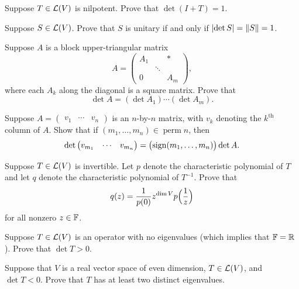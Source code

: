 \begin{exercise}
Suppose $T\in\Lin(V)$ is nilpotent. Prove that $\det(I+T)=1$.
\end{exercise}

\begin{exercise}
Suppose $S\in\Lin(V)$. Prove that $S$ is unitary if and only if
$\abs{\det S}=\norm{S}=1$.
\end{exercise}

\begin{exercise}
Suppose $A$ is a block upper-triangular matrix
\[ A = \begin{pmatrix}
       A_1 &        & *\\
           & \ddots &  \\
       0   &        & A_m
       \end{pmatrix}, \]
where each $A_k$ along the diagonal is a square matrix. Prove that
\[ \det A = (\det A_1)\cdots(\det A_m). \]
\end{exercise}

\begin{exercise}
Suppose $A=\begin{pmatrix} v_1 & \cdots & v_n \end{pmatrix}$ is an $n$-by-$n$
matrix, with $v_k$ denoting the $k^{\text{th}}$ column of $A$. Show that if
$(m_1,\dots,m_n)\in\operatorname{perm} n$, then
\[ \det\begin{pmatrix} v_{m_1} & \cdots & v_{m_n} \end{pmatrix}
   = \bigl(\sgn(m_1,\dots,m_n)\bigr)\det A. \]
\end{exercise}

\begin{exercise}
Suppose $T\in\Lin(V)$ is invertible. Let $p$ denote the characteristic
polynomial of $T$ and let $q$ denote the characteristic polynomial of $T^{-1}$.
Prove that
\[ q(z) = \frac{1}{p(0)}z^{\dim V}p\Bigl(\frac{1}{z}\Bigr) \]
for all nonzero $z\in\F$.
\end{exercise}

\begin{exercise}
Suppose $T\in\Lin(V)$ is an operator with no eigenvalues (which implies that
$\F=\R$). Prove that $\det T>0$.
\end{exercise}

\begin{exercise}
Suppose that $V$ is a real vector space of even dimension, $T\in\Lin(V)$, and
$\det T<0$. Prove that $T$ has at least two distinct eigenvalues.
\end{exercise}

